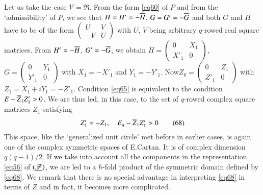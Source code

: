 Let us take the case $\mathscr{V}=\mathfrak{R}$. From the form
\eqref{eq60} of $P$ and from the `admissibility' of $P$, we see that
$H=H'=-\overline{H}$, $G=G'=-\overline{G}$ and both $G$ and $H$ have to be of the
form
$\left(\begin{smallmatrix} U & V\\ -V & U
\end{smallmatrix}\right)$ with $U$, $V$ being arbitrary $q$-rowed real
square matrices. From $H'=-\overline{H}$, $G'=-\overline{G}$, we obtain $H=\left(
\begin{smallmatrix} 0 & X_{1}\\ X'_{1} & 0
\end{smallmatrix}\right)$, $G=\left(\begin{smallmatrix} 0 &
  Y_{1}\\ Y'_{1} & 0
\end{smallmatrix}\right)$ with $X_{1}=-X'_{1}$ and
$Y_{1}=-Y'_{1}$. Now\pageoriginale $Z_{0}=\left(\begin{smallmatrix} 0
  & Z_{1}\\ Z'_{1} & 0
\end{smallmatrix}\right)$ with $Z_{1}=X_{1}+iY_{1}=-Z'_{1}$. Condition
\eqref{eq65} is equivalent to the condition $E-\overline{Z}_{1}Z'_{1}>0$. We
are thus led, in this case, to the set of $q$-rowed complex square
matrices $Z_{1}$ satisfying
\begin{equation*}
Z'_{1}=-Z_{1},\quad E_{q}-\overline{Z}_{1}Z'_{1}>0\tag{68}\label{eq68}
\end{equation*}
This space, like the `generalized unit circle' met before in earlier
cases, is again one of the complex symmetric spaces of E.\@ Cartan. It
is of complex dimension $q(q-1)/2$. If we take into account all the
components in the representation \eqref{eq56} of $(\underline{\mathscr{F}})$,
we are led to a $h$-fold product of the symmetric domain defined by
\eqref{eq68}. We remark that there is no special advantage in
interpreting \eqref{eq68} in terms of $Z$ and in fact, it becomes more
complicated.

